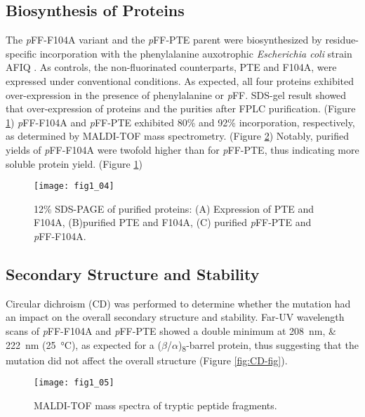 \begin{refsection}
\subsection{Biosynthesis of Proteins}

The \emph{p}FF-F104A variant and the \emph{p}FF-PTE parent were biosynthesized
by residue-specific incorporation with the phenylalanine auxotrophic
\emph{Escherichia coli} strain AFIQ \cite{Yang2014a}. As controls, the
non-fluorinated counterparts, PTE and F104A, were expressed under conventional
conditions. As expected, all four proteins exhibited over-expression in the
presence of phenylalanine or \emph{p}FF. SDS-gel result showed that
over-expression of proteins and the purities after FPLC purification. (Figure
\ref{fig:sds-gel}) \emph{p}FF-F104A and \emph{p}FF-PTE exhibited 80\% and 92\%
incorporation, respectively, as determined by MALDI-TOF
mass spectrometry. (Figure \ref{fig:MALDI-fig}) Notably, purified yields of
\emph{p}FF-F104A were twofold higher than for \emph{p}FF-PTE, thus indicating
more soluble protein yield. (Figure \ref{fig:sds-gel})

\begin{figure}[h!] \centering \texttt{[image: fig1\_04]}
    \caption[12\% SDS-PAGE of purified proteins: (A) Expression of PTE and
    F104A, (B)purified PTE and F104A, (C) purified \emph{p}FF-PTE and
\emph{p}FF-F104A.]{12\% SDS-PAGE of purified proteins: (A) Expression of PTE
    and F104A, (B)purified PTE and F104A, (C) purified \emph{p}FF-PTE and
    \emph{p}FF-F104A.} 
    \label{fig:sds-gel}
\end{figure}

\subsection{Secondary Structure and Stability}

Circular dichroism (CD) was performed to determine whether the mutation had an
impact on the overall secondary structure and stability. Far-UV wavelength
scans of \emph{p}FF-F104A and \emph{p}FF-PTE showed a double minimum at
\SIlist{208;222}{\nm} (\SI{25}{\celsius}), as expected for a
($\beta$/$\alpha$)\textsubscript{8}-barrel protein, thus suggesting that the
mutation did not affect the overall structure (Figure \ref{fig:CD-fig}).  

\begin{figure}[h!] \centering \texttt{[image: fig1\_05]}
    \caption[MALDI-TOF mass spectra of tryptic peptide fragments.]{MALDI-TOF
    mass spectra of tryptic peptide fragments.} \label{fig:MALDI-fig} 
\end{figure}


\end{refsection}

